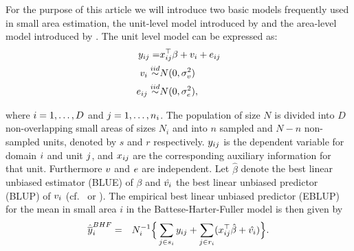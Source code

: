 \documentclass[article]{ajs}
\begin{document}
For the purpose of this article we will introduce two basic models frequently used in small area estimation, the unit-level model introduced by \cite{battese88} and the area-level model introduced by \cite{fay79}. The unit level model \citep{battese88} can be expressed as:
\begin{eqnarray}
	 y_{ij} =& x_{ij}^\top\beta + v_{i} + e_{ij} \nonumber \\
	v_{i} \stackrel{iid}{\sim}& N(0, \sigma_v^2)  \nonumber \\
	e_{ij} \stackrel{iid}{\sim}& N(0, \sigma_e^2) \nonumber,
\end{eqnarray}

where $i = 1, \dots, D$ and $j = 1, \dots, n_i$. The population of size $N$ is divided into $D$ non-overlapping small areas of sizes $N_i$ and into $n$ sampled and $N-n$ non-sampled units, denoted by $s$ and $r$ respectively. $y_{ij}$ is the dependent variable for domain $i$ and unit $j$, and $x_{ij}$ are the corresponding auxiliary information for that unit. Furthermore $v$ and $e$ are independent. Let $\hat{\beta}$ denote the best linear unbiased estimator (BLUE) of $\beta$ and $\hat{v_{i}}$ the best linear unbiased predictor (BLUP) of $v_{i}$ (cf.\ \citealp{Hen50} or \citealp{Sea71}). The empirical best linear unbiased predictor (EBLUP) for the mean in small area $i$ in the Battese-Harter-Fuller model is then given by
\begin{eqnarray}\label{BHFEBLUP}\hat{\overline{y}}_i^{BHF}&=&N_i^{-1}\Big\{\sum_{j\in s_i}y_{ij}+\sum_{j\in r_i}(x_{ij}^\top\hat{{\beta}}+\hat{v_{i}})\Big\}.
\end{eqnarray}
\end{document}
